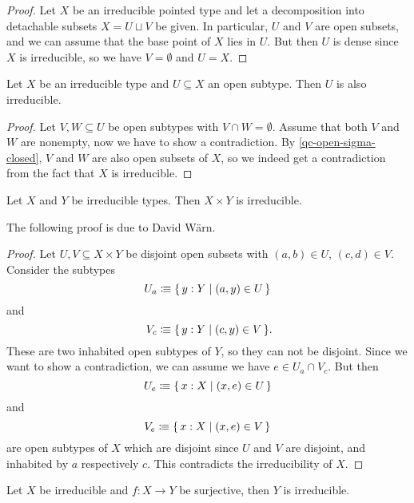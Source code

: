 \begin{proof}
  Let $X$ be an irreducible pointed type
  and let a decomposition into detachable subsets $X = U \sqcup V$ be given.
  In particular, $U$ and $V$ are open subsets,
  and we can assume that the base point of $X$ lies in $U$.
  But then $U$ is dense since $X$ is irreducible,
  so we have $V = \emptyset$ and $U = X$.
\end{proof}

\begin{proposition}%
  \label{open-subtype-of-irred-is-irred}
  Let $X$ be an irreducible type
  and $U \subseteq X$ an open subtype.
  Then $U$ is also irreducible.
\end{proposition}

\begin{proof}
  Let $V, W \subseteq U$ be open subtypes with $V \cap W = \emptyset$.
  Assume that both $V$ and $W$ are nonempty,
  now we have to show a contradiction.
  By \cref{qc-open-sigma-closed},
  $V$ and $W$ are also open subsets of $X$,
  so we indeed get a contradiction
  from the fact that $X$ is irreducible.
\end{proof}

\begin{lemma}%
  \label{product-irreducible}
  Let $X$ and $Y$ be irreducible types.
  Then $X \times Y$ is irreducible.
\end{lemma}

The following proof is due to David Wärn.

\begin{proof}
  Let $U, V \subseteq X \times Y$
  be disjoint open subsets with $(a, b) \in U$, $(c, d) \in V$.
  Consider the subtypes
  \[ U_a \vcentcolon\mspace{-1.2mu}\equiv \{\, y : Y \mid (a, y) \in U \,\} \]
  and
  \[ V_c \colonequiv \{\, y : Y \mid (c, y) \in V \,\} \rlap{.}\]
  These are two inhabited open subtypes of $Y$,
  so they can not be disjoint.
  Since we want to show a contradiction,
  we can assume we have $e \in U_a \cap V_c$.
  But then
  \[ U_e \vcentcolon\mspace{-1.2mu}\equiv \{\, x : X \mid (x, e) \in U \,\} \]
  and
  \[ V_e \vcentcolon\mspace{-1.2mu}\equiv \{\, x : X \mid (x, e) \in V \,\} \]
  are open subtypes of $X$ which are
  disjoint since $U$ and $V$ are disjoint,
  and inhabited by $a$ respectively $c$.
  This contradicts the irreducibility of $X$.
\end{proof}

\begin{lemma}%
  \label{surjection-irreducible}
  Let $X$ be irreducible and $f:X\to Y$ be surjective,
  then $Y$ is irreducible.
\end{lemma}

